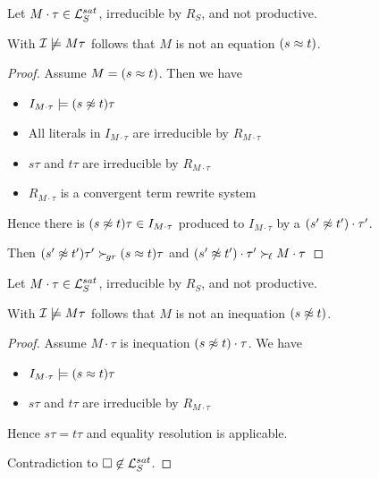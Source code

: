 \documentclass[%
handout,
]{beamer}
\begin{document}
\begin{frame}

    \begin{lemma}\label{equation}
        Let $M\cdot\tau\in\mathcal{L}_S^{sat}$,
        irreducible by $R_S$, and not productive.

        With $\mathcal{I}\not\models M\tau$ follows that $M$ is not an equation $(s\approx t)$.

    \begin{proof}
        Assume $M = (s\approx t)$. Then we have
        \begin{itemize}
            \item $I_{M\cdot\tau}\models (s\not\approx t)\tau$
            \item All literals in $I_{M\cdot\tau}$ are irreducible by $R_{M\cdot\tau}$
            \item $s\tau$ and $t\tau$ are irreducible by $R_{M\cdot\tau}$
            \item $R_{M\cdot\tau}$ is a convergent term rewrite system
        \end{itemize}
        Hence there is $(s\not\approx t)\tau\in I_{M\cdot\tau}$
        produced to $I_{M\cdot\tau}$ by a $(s'\not\approx t')\cdot\tau'$.

        Then $(s'\not\approx t')\tau'\mathrel\succ_{\!gr} (s\approx t)\tau$ and $(s'\not\approx t')\cdot\tau'\mathrel\succ_{\!\ell} M\cdot\tau$
    \end{proof}
    \end{lemma}
\end{frame}
\begin{frame}
    \begin{lemma}\label{inequation}
        Let $M\cdot\tau\in\mathcal{L}_S^{sat}$,
        irreducible by $R_S$, and not productive.

        With $\mathcal{I}\not\models M\tau$ follows that $M$ is not an inequation $(s\not\approx t)$.
        \begin{proof}
        Assume $M\cdot\tau$ is inequation $(s\not\approx t)\cdot\tau$. We have
        \begin{itemize}
            \item $I_{M\cdot\tau}\models (s\approx t)\tau$
            \item $s\tau$ and $t\tau$ are irreducible by $R_{M\cdot\tau}$
        \end{itemize}
        Hence $s\tau = t\tau$ and equality resolution is applicable.

        Contradiction to $\square\not\in\mathcal{L}_S^{sat}$.
    \end{proof}
    \end{lemma}

\end{frame}
\end{document}
